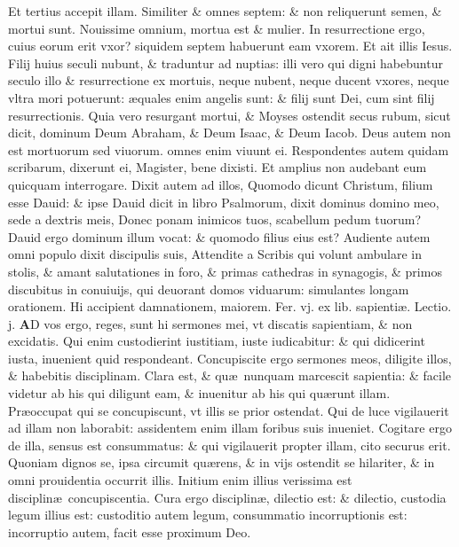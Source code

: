 \documentclass[a5paper,10pt]{book}
\def\leftmarginnote{%
	\lrmarginnote{\hskip -\marginparsep \hskip -6.5em}}
\def\ae{æ}
\begin{document}
\begin{multicols*}{2}
Et tertius accepit illam. Similiter \& omnes septem: \& non reliquerunt semen, \& mortui sunt. Nouissime omnium, mortua est \& mulier.
In resurrectione ergo, cuius eorum erit vxor? siquidem septem habuerunt eam vxorem. Et ait illis Iesus. Filij huius seculi nubunt, \& traduntur ad nuptias: illi vero qui digni habebuntur seculo illo \& resurrectione ex mortuis, neque nubent, neque ducent vxores, neque vltra mori potuerunt: \ae quales enim angelis sunt: \& filij
sunt Dei, cum sint filij resurrectionis.
Quia vero resurgant mortui, \& Moyses ostendit secus rubum, sicut dicit, dominum Deum Abraham, \& Deum Isaac, \& Deum Iacob.
Deus autem non est mortuorum sed viuorum. omnes enim viuunt ei. Respondentes autem quidam scribarum, dixerunt ei, Magister, bene dixisti. Et amplius non audebant eum quicquam interrogare.
Dixit autem ad illos, Quomodo dicunt Christum, filium esse Dauid: \& ipse Dauid dicit in libro Psalmorum, dixit dominus domino meo, sede a dextris meis, Donec ponam inimicos tuos, scabellum pedum tuorum?
Dauid ergo dominum illum vocat: \& quomodo filius eius est? Audiente autem omni populo dixit discipulis suis, Attendite a Scribis qui volunt ambulare in stolis, \& amant salutationes in foro, \& primas cathedras in synagogis, \& primos discubitus in conuiuijs, qui deuorant domos viduarum: simulantes longam orationem.
Hi accipient damnationem, maiorem.
\newline {} \color{red} \hypertarget{FRI-TERTIA-POST-ADV}{Fer. vj.} ex lib. sapienti\ae . Lectio. j. \color{black}
\vspace{-2.25em}
\lettrine[lines=2]{\bfseries A}{}D\leftmarginnote{\begin{flushright}ca. 6.\end{flushright}} vos ergo, reges, sunt hi sermones mei, vt discatis sapientiam, \& non excidatis.
Qui enim custodierint iustitiam, iuste iudicabitur: \& qui didicerint iusta, inuenient quid respondeant. Concupiscite ergo sermones meos, diligite illos, \& habebitis disciplinam.
Clara est, \& qu\ae \ nunquam marcescit sapientia: \& facile videtur ab his qui diligunt eam, \& inuenitur ab his qui qu\ae runt illam.
Pr\ae occupat qui se concupiscunt, vt illis se prior ostendat. Qui de luce vigilauerit ad illam non laborabit: assidentem enim illam foribus suis inueniet.
Cogitare ergo de illa, sensus est consummatus: \& qui vigilauerit propter illam, cito securus erit. Quoniam dignos se, ipsa circumit qu\ae rens, \& in vijs ostendit se hilariter, \& in omni prouidentia occurrit illis.
Initium enim illius verissima est disciplin\ae \ concupiscentia. Cura ergo disciplin\ae , dilectio est: \& dilectio, custodia legum illius est: custoditio autem legum, consummatio incorruptionis est: incorruptio autem, facit esse proximum Deo.

\end{multicols*}
\end{document}
